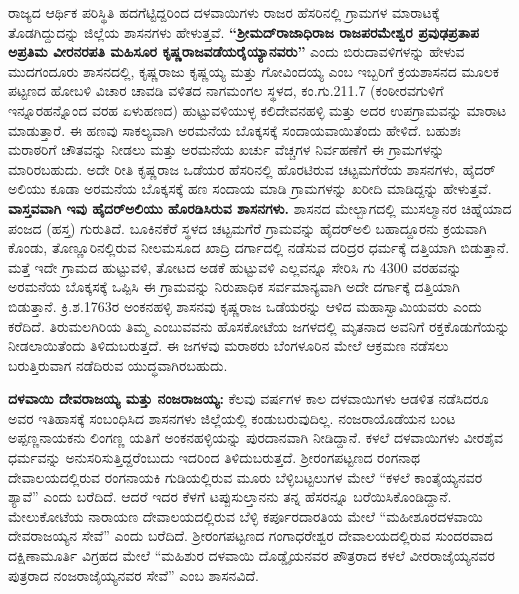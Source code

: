 ರಾಜ್ಯದ ಆರ್ಥಿಕ ಪರಿಸ್ಥಿತಿ ಹದಗೆಟ್ಟಿದ್ದರಿಂದ ದಳವಾಯಿಗಳು ರಾಜರ ಹೆಸರಿನಲ್ಲಿ ಗ್ರಾಮಗಳ ಮಾರಾಟಕ್ಕೆ ತೊಡಗಿದ್ದುದನ್ನು ಜಿಲ್ಲೆಯ ಶಾಸನಗಳು ಹೇಳುತ್ತವೆ. \textbf{“ಶ‍್ರೀಮದ್​ರಾಜಾಧಿರಾಜ ರಾಜಪರಮೇಶ್ವರ ಪ್ರವುಢಪ್ರತಾಪ ಅಪ್ರತಿಮ ವೀರನರಪತಿ ಮಹಿಸೂರ ಕೃಷ್ಣರಾಜವಡೆಯರೈಯ್ಯಾನವರು”} ಎಂದು ಬಿರುದಾವಳಿಗಳನ್ನು ಹೇಳುವ ಮುದಗಂದೂರು ಶಾಸನದಲ್ಲಿ, ಕೃಷ್ಣರಾಜು ಕೃಷ್ಣಯ್ಯ ಮತ್ತು ಗೋವಿಂದಯ್ಯ ಎಂಬ ಇಬ್ಬರಿಗೆ ಕ್ರಯಶಾಸನದ ಮೂಲಕ ಪಟ್ಟಣದ ಹೋಬಳಿ ವಿಚಾರ ಚಾವಡಿ ವಳಿತದ ನಾಗಮಂಗಲ ಸ್ಥಳದ, ಕಂ.ಗು.211.7 (ಕಂಠೀರವಗುಳಿಗೆ ಇನ್ನೂರಹನ್ನೊಂದ ವರಹ ಏಳುಹಣದ) ಹುಟ್ಟುವಳಿಯುಳ್ಳ ಕಲಿದೇವನಹಳ್ಳಿ ಮತ್ತು ಅದರ ಉಪಗ್ರಾಮವನ್ನು ಮಾರಾಟ ಮಾಡುತ್ತಾರೆ. ಈ ಹಣವು ಸಾಕಲ್ಯವಾಗಿ ಅರಮನೆಯ ಬೊಕ್ಕಸಕ್ಕೆ ಸಂದಾಯವಾಯಿತೆಂದು ಹೇಳಿದೆ. ಬಹುಶಃ ಮರಾಠರಿಗೆ ಚೌತವನ್ನು ನೀಡಲು ಮತ್ತು ಅರಮನೆಯ ಖರ್ಚು ವೆಚ್ಚಗಳ ನಿರ್ವಹಣೆಗೆ ಈ ಗ್ರಾಮಗಳನ್ನು ಮಾರಿರಬಹುದು. ಅದೇ ರೀತಿ ಕೃಷ್ಣರಾಜ ಒಡೆಯರ ಹೆಸರಿನಲ್ಲಿ ಹೊರಟಿರುವ ಚಟ್ಟಮಗೆರೆಯ ಶಾಸನಗಳು, ಹೈದರ್​ಅಲಿಯು ಕೂಡಾ ಅರಮನೆಯ ಬೊಕ್ಕಸಕ್ಕೆ ಹಣ ಸಂದಾಯ ಮಾಡಿ ಗ್ರಾಮಗಳನ್ನು ಖರೀದಿ ಮಾಡಿದ್ದನ್ನು ಹೇಳುತ್ತವೆ. \textbf{ವಾಸ್ತವವಾಗಿ ಇವು ಹೈದರ್​ಅಲಿಯು ಹೊರಡಿಸಿರುವ ಶಾಸನಗಳು.} ಶಾಸನದ ಮೇಲ್ಬಾಗದಲ್ಲಿ ಮುಸಲ್ಮಾನರ ಚಿಹ್ನೆಯಾದ ಪಂಜದ (ಹಸ್ತ) ಗುರುತಿದೆ. ಬೂಕಿನಕೆರೆ ಸ್ಥಳದ ಚಟ್ಟಮಗೆರೆ ಗ್ರಾಮವನ್ನು ಹೈದರ್​ಅಲಿ ಬಹಾದ್ದೂರನು ಕ್ರಯವಾಗಿ ಕೊಂಡು, ತೊಣ್ಣೂರಿನಲ್ಲಿರುವ ನೀಲಮಸೂದ ಖಾದ್ರಿ ದರ್ಗಾದಲ್ಲಿ ನಡೆಸುವ ದರಿದ್ರರ ಧರ್ಮಕ್ಕೆ ದತ್ತಿಯಾಗಿ ಬಿಡುತ್ತಾನೆ. ಮತ್ತೆ ಇದೇ ಗ್ರಾಮದ ಹುಟ್ಟುವಳಿ, ತೋಟದ ಅಡಕೆ ಹುಟ್ಟುವಳಿ ಎಲ್ಲವನ್ನೂ ಸೇರಿಸಿ ಗು 4300 ವರಹವನ್ನು ಅರಮನೆಯ ಬೊಕ್ಕಸಕ್ಕೆ ಒಪ್ಪಿಸಿ ಈ ಗ್ರಾಮವನ್ನು ನಿರುಪಾಧಿಕ ಸರ್ವಮಾನ್ಯವಾಗಿ ಅದೇ ದರ್ಗಾಕ್ಕೆ ದತ್ತಿಯಾಗಿ ಬಿಡುತ್ತಾನೆ. ಕ್ರಿ.ಶ.1763ರ ಅಂಕನಹಳ್ಳಿ ಶಾಸನವು ಕೃಷ್ಣರಾಜ ಒಡೆಯರನ್ನು ಆಳಿದ ಮಹಾಸ್ವಾಮಿಯವರು ಎಂದು ಕರೆದಿದೆ. ತಿರುಮಲಗಿರಿಯ ತಿಮ್ಮ ಎಂಬುವವನು ಹೊಸಕೋಟೆಯ ಜಗಳದಲ್ಲಿ ಮೃತನಾದ ಅವನಿಗೆ ರಕ್ತಕೊಡುಗೆಯನ್ನು ನೀಡಲಾಯಿತೆಂದು ತಿಳಿದುಬರುತ್ತದೆ. ಈ ಜಗಳವು ಮರಾಠರು ಬೆಂಗಳೂರಿನ ಮೇಲೆ ಆಕ್ರಮಣ ನಡೆಸಲು ಬರುತ್ತಿರುವಾಗ ನಡೆದಿರುವ ಯುದ್ಧವಾಗಿರಬಹುದು.

\textbf{ದಳವಾಯಿ ದೇವರಾಜಯ್ಯ ಮತ್ತು ನಂಜರಾಜಯ್ಯ: } ಕೆಲವು ವರ್ಷಗಳ ಕಾಲ ದಳವಾಯಿಗಳು ಆಡಳಿತ ನಡೆಸಿದರೂ ಅವರ ಇತಿಹಾಸಕ್ಕೆ ಸಂಬಂಧಿಸಿದ ಶಾಸನಗಳು ಜಿಲ್ಲೆಯಲ್ಲಿ ಕಂಡುಬರುವುದಿಲ್ಲ. ನಂಜರಾಯೊಡೆಯನ ಬಂಟ ಅಪ್ಪಣ್ಣನಾಯಕನು ಲಿಂಗಣ್ಣ ಯತಿಗೆ ಅಂಕನಹಳ್ಳಿಯನ್ನು ಪುರದಾನವಾಗಿ ನೀಡಿದ್ದಾನೆ. ಕಳಲೆ ದಳವಾಯಿಗಳು ವೀರಶೈವ ಧರ್ಮವನ್ನು ಅನುಸರಿಸುತ್ತಿದ್ದರೆಂಬುದು ಇದರಿಂದ ತಿಳಿದುಬರುತ್ತದೆ. ಶ‍್ರೀರಂಗಪಟ್ಟಣದ ರಂಗನಾಥ ದೇವಾಲಯದಲ್ಲಿರುವ ರಂಗನಾಯಕಿ ಗುಡಿಯಲ್ಲಿರುವ ಮೂರು ಬೆಳ್ಳಿಬಟ್ಟಲುಗಳ ಮೇಲೆ “ಕಳಲೆ ಕಾಂತೈಯ್ಯನವರ ಶ್ಯಾವೆ” ಎಂದು ಬರೆದಿದೆ. ಆದರೆ ಇದರ ಕೆಳಗೆ ಟಪ್ಪುಸುಲ್ತಾನನು ತನ್ನ ಹೆಸರನ್ನೂ ಬರೆಯಿಸಿಕೊಂಡಿದ್ದಾನೆ. ಮೇಲುಕೋಟೆಯ ನಾರಾಯಣ ದೇವಾಲಯ\-ದಲ್ಲಿರುವ ಬೆಳ್ಳಿ ಕರ್ಪೂರದಾರತಿಯ ಮೇಲೆ “ಮಹೀಶೂರದಳವಾಯಿ ದೇವರಾಜಯ್ಯನ ಸೇವೆ” ಎಂದು ಬರೆದಿದೆ. ಶ‍್ರೀರಂಗಪಟ್ಟಣದ ಗಂಗಾಧರೇಶ್ವರ ದೇವಾಲಯದಲ್ಲಿರುವ ಸುಂದರವಾದ ದಕ್ಷಿಣಾಮೂರ್ತಿ ವಿಗ್ರಹದ ಮೇಲೆ “ಮಹಿಶುರ ದಳವಾಯಿ ದೊಡ್ಡೈಯ\-ನವರ ಪೌತ್ರರಾದ ಕಳಲೆ ವೀರರಾಜೈಯ್ಯನವರ ಪುತ್ರರಾದ ನಂಜರಾಜೈಯ್ಯನವರ ಸೇವೆ” ಎಂಬ ಶಾಸನವಿದೆ.


